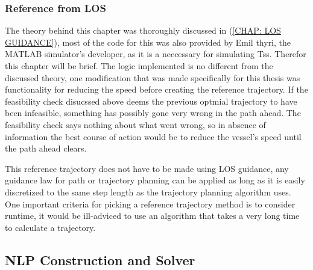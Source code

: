 \subsubsection*{Reference from LOS}
The theory behind this chapter was thoroughly discussed in (\ref{CHAP: LOS GUIDANCE}), most of the code for this was also provided by
Emil thyri, the MATLAB simulator's developer, as it is a neccessary for simulating \gls{Ts}s. Therefor this chapter will be brief. The logic implemented
is no different from the discussed theory, one modification that was made specifically for this thesis was functionality for reducing the speed
before creating the reference trajectory. If the feasibility check disucssed above deems the previous optmial trajectory to have been infeasible, something
has possibly gone very wrong in the path ahead. The feasibility check says nothing about what went wrong, so in absence of information the best
course of action would be to reduce the vessel's speed until the path ahead clears. 

This reference trajectory does not have to be made using LOS guidance, any guidance law for path or trajectory planning can be applied as long as
it is easily discretized to the same step length as the trajectory planning algorithm uses. One important criteria for picking a reference trajectory 
method is to consider runtime, it would be ill-adviced to use an algorithm that takes a very long time to calculate a trajectory.

\subsection{NLP Construction and Solver} 


